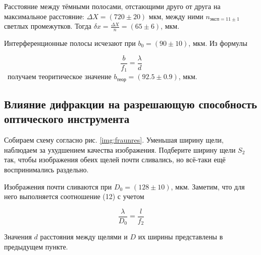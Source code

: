 \documentclass[a5paper,10pt, twoside]{article} %
\begin{document}
Расстояние между тёмными полосами, отстающими друго от друга на максимальное
расстояние: $\Delta X = (720 \pm 20)$ мкм, между ними $n_{\text{эксп} = 11 \pm 1}$ светлых
промежутков. Тогда $\delta x = \frac{\Delta X}{n} = (65 \pm 6)$, мкм.

Интерференционные полосы исчезают при $b_0 = (90 \pm 10)$, мкм. Из формулы

\begin{displaymath}
	\frac{b}{f_1} = \frac{\lambda}{d}
\end{displaymath}
\
получаем теоритическое значение $b_{\text{теор}} = (92.5 \pm 0.9)$, мкм.

\subsection{Влияние дифракции на разрешающую способность оптического инструмента}

Собираем схему согласно рис. \ref{img:fraunres}. Уменьшая ширину щели, наблюдаем за ухудшением 
качества изображения. Подберите ширину щели $S_2$ так, чтобы изображения обеих щелей почти сливались, 
но всё-таки ещё воспринимались раздельно.

Изображения почти сливаются при $D_0 = (128 \pm 10)$, мкм. Заметим, что для него выполняется
соотношение (12) с учетом 

\begin{displaymath}
	\frac{\lambda}{D_0} = \frac{l}{f_2}
\end{displaymath}

Значения $d$ расстояния между щелями и $D$ их ширины представлены в предыдущем пункте.
\end{document}
